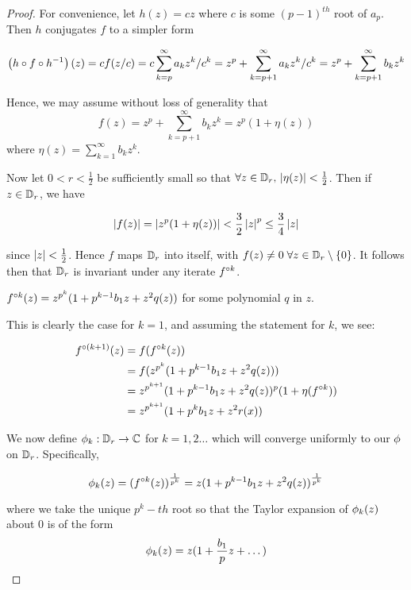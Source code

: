 \documentclass[../main.tex]{subfiles}
\begin{document}
\begin{proof}

For convenience, let $h(z)=cz$ where $c$ is some $(p-1)^{th}$ root of $a_p$. Then $h$ conjugates $f$ to a simpler form

$$ \left(h\circ f \circ h^{-1}\right)(z) = cf(z/c) = c \sum_{k=p}^{\infty} a_{k}z^k/c^k = z^p +\sum_{k=p+1}^{\infty} a_k z^k/c^k= z^p +\sum_{k=p+1}^{\infty} b_k z^k$$

Hence, we may assume without loss of generality that 
\[
f(z) = z^p +\sum_{k=p+1}^{\infty} b_k z^k = z^p(1+\eta(z))
\]
where $\eta(z) = \sum_{k=1}^{\infty} b_k z^k$.

Now let $0<r<\frac{1}{2}$ be sufficiently small so that $\forall z \in \mathbb{D}_r,\, \left|\eta(z)\right|<\frac{1}{2} $. Then if $z \in \mathbb{D}_r$, we have

$$\left|f(z)\right|=\left|z^p(1+\eta(z))\right|<\frac{3}{2}\left|z\right|^p\leq \frac{3}{4}\left|z\right|$$

since $\left|z\right|<\frac{1}{2}$. Hence $f$ maps $\mathbb{D}_r$ into itself, with $f(z) \neq 0\; \forall z \in \mathbb{D}_r \setminus \{0\}$. It follows then that $\mathbb{D}_r$ is invariant under any iterate $f^{\circ k}$.

\begin{claim}
$f^{\circ k}(z) = z^{p^k}(1+p^{k-1}b_1z +z^2q(z))$ for some polynomial $q$ in $z$.
\end{claim}  
\begin{subproof}
This is clearly the case for $k=1$, and assuming the statement for $k$, we see:

\begin{align*}
    f^{\circ(k+1)}(z) & = f(f^{\circ k}(z)) \\
    & = f(z^{p^k}(1+p^{k-1}b_1z +z^2q(z))) \\
    & = z^{p^{k+1}}(1+p^{k-1}b_1z+z^2q(z))^p(1 + \eta(f^{\circ k})) \\
    & = z^{p^{k+1}}(1+p^k b_1z +z^2r(x))
\end{align*}
\end{subproof}

We now define $\phi_k : \mathbb{D}_r \to \mathbb{C}$ for $k=1,2\dots$ which will converge uniformly to our $\phi$ on $\mathbb{D}_r$. Specifically,

$$\phi_k(z) = (f^{\circ k}(z))^{\frac{1}{p^k}} = z(1+p^{k-1}b_1z +z^2q(z))^\frac{1}{p^k}$$ 

where we take the unique $p^{k}-th$ root so that the Taylor expansion of $\phi_k(z)$ about $0$ is of the form
\[
\phi_k(z) = z(1+\frac{b_1}{p}z+\dots)
\]


\end{proof}
\end{document}
